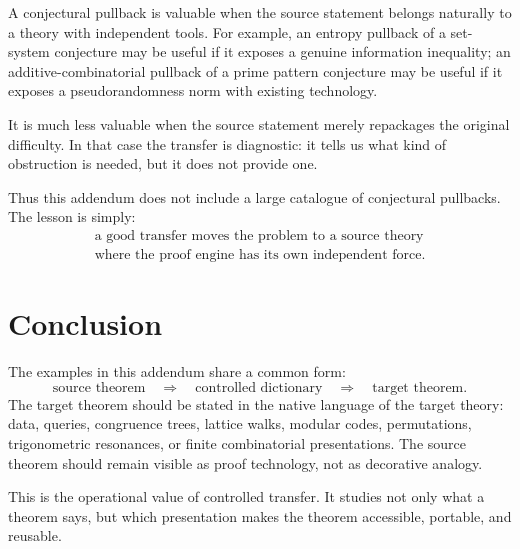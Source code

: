 \documentclass[11pt]{article}
\begin{document}
A conjectural pullback is valuable when the source statement belongs naturally to a theory with independent tools. For example, an entropy pullback of a set-system conjecture may be useful if it exposes a genuine information inequality; an additive-combinatorial pullback of a prime pattern conjecture may be useful if it exposes a pseudorandomness norm with existing technology.

It is much less valuable when the source statement merely repackages the original difficulty. In that case the transfer is diagnostic: it tells us what kind of obstruction is needed, but it does not provide one.

Thus this addendum does not include a large catalogue of conjectural pullbacks. The lesson is simply:
\[
\begin{gathered}
\text{a good transfer moves the problem to a source theory}\\
\text{where the proof engine has its own independent force.}
\end{gathered}
\]

\section{Conclusion}

The examples in this addendum share a common form:
\[
\boxed{
\text{source theorem}
\quad\Longrightarrow\quad
\text{controlled dictionary}
\quad\Longrightarrow\quad
\text{target theorem}.
}
\]
The target theorem should be stated in the native language of the target theory: data, queries, congruence trees, lattice walks, modular codes, permutations, trigonometric resonances, or finite combinatorial presentations. The source theorem should remain visible as proof technology, not as decorative analogy.

This is the operational value of controlled transfer. It studies not only what a theorem says, but which presentation makes the theorem accessible, portable, and reusable.
\end{document}
